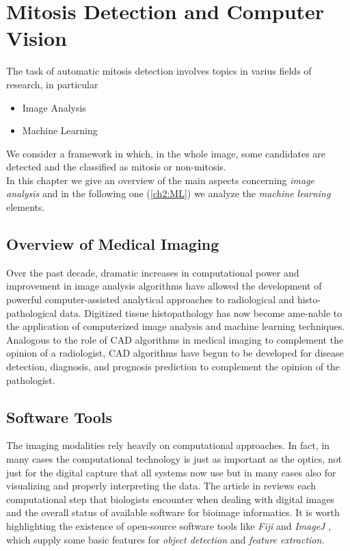 \vspace{0.5cm}

\section{Mitosis Detection and Computer Vision}


The task of automatic mitosis detection involves topics in varius fields of research, in particular

\begin{itemize}
 \item Image Analysis
 \item Machine Learning
\end{itemize}

We consider a framework in which, in the whole image, some candidates are detected and the classified as mitosis or non-mitosis.\\
In this chapter we give an overview of the main aspects concerning \textit{image analysis} and in the following one (\ref{ch2:ML}) we analyze the \textit{machine learning} elements.




\subsection{Overview of Medical Imaging}

Over the past decade, dramatic increases in computational power and improvement in image analysis algorithms have
allowed the development of powerful computer-assisted analytical approaches to radiological and histo-pathological data\cite{HistopatImaging01Review}.
Digitized tissue histopathology has now become ame-nable to the application of computerized image analysis and machine learning techniques.
Analogous to the role of \Gls{CAD} algorithms in medical imaging to complement the opinion of a radiologist, \Gls{CAD} algorithms have begun to be developed for
disease detection, diagnosis, and prognosis prediction to complement the opinion of the pathologist\cite{sertel2009computer}.

\subsection{Software Tools}

The imaging modalities rely heavily on computational approaches. In fact, in many cases the computational technology is just as important as the optics,
not just for the digital capture that all systems now use but in many cases also for visualizing and properly interpreting the data.
The article in 	\cite{BioImagingSW05} reviews each computational step that biologists encounter when dealing with digital images and the overall status of available software for bioimage informatics.
It is worth highlighting the existence of open-source software tools like \textit{Fiji} \cite{BioImagingSW03} and \textit{ImageJ} \cite{BioImagingSW02}, which supply some basic features
for \textit{object detection} and \textit{feature extraction}\cite{featuresReviewBioinformatics}.

